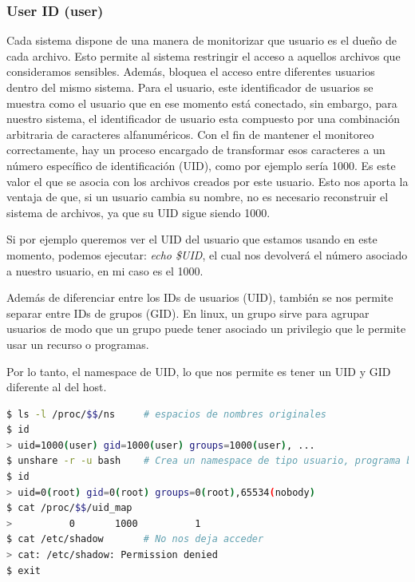 \documentclass[12pt]{article}
\begin{document}
	
	\pagebreak
	\subsubsection{User ID (user)}
	\par \noindent Cada sistema dispone de una manera de monitorizar que usuario es el dueño de cada archivo. Esto permite al sistema restringir el acceso a aquellos archivos que consideramos sensibles. Además, bloquea el acceso entre diferentes usuarios dentro del mismo sistema. Para el usuario, este identificador de usuarios se muestra como el usuario que en ese momento está conectado, sin embargo, para nuestro sistema, el identificador de usuario esta compuesto por una combinación arbitraria de caracteres alfanuméricos. Con el fin de mantener el monitoreo correctamente, hay un proceso encargado de transformar esos caracteres a un número específico de identificación (UID), como por ejemplo sería 1000. Es este valor el que se asocia con los archivos creados por este usuario. Esto nos aporta la ventaja de que, si un usuario cambia su nombre, no es necesario reconstruir el sistema de archivos, ya que su UID sigue siendo 1000.\\
	
	\par \noindent Si por ejemplo queremos ver el UID del usuario que estamos usando en este momento, podemos ejecutar: \textit{echo \$UID}, el cual nos devolverá el número asociado a nuestro usuario, en mi caso es el 1000.\\
	
	\par \noindent Además de diferenciar entre los IDs de usuarios (UID), también se nos permite separar entre IDs de grupos (GID). En linux, un grupo sirve para agrupar usuarios de modo que un grupo puede tener asociado un privilegio que le permite usar un recurso o programas.\\
	
	\par \noindent Por lo tanto, el namespace de UID, lo que nos permite es tener un UID y GID diferente al del host. 
	
	\begin{lstlisting}[language=bash, caption=Ejemplo de uso UID namespace]
$ ls -l /proc/$$/ns		# espacios de nombres originales
$ id
> uid=1000(user) gid=1000(user) groups=1000(user), ...
$ unshare -r -u bash	# Crea un namespace de tipo usuario, programa bash
$ id
> uid=0(root) gid=0(root) groups=0(root),65534(nobody)
$ cat /proc/$$/uid_map
>          0       1000          1
$ cat /etc/shadow		# No nos deja acceder
> cat: /etc/shadow: Permission denied
$ exit
	\end{lstlisting}
	
\end{document}
